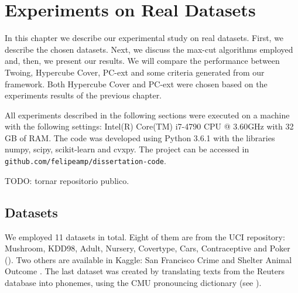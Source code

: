 \newpage

\chapter{Experiments on Real Datasets}
\label{chap:experiments-datasets}


In this chapter we describe our experimental study on real datasets. First, we describe the chosen datasets. Next, we discuss the max-cut algorithms 
employed and, then, we present our results. We will compare the performance between Twoing, Hypercube Cover, PC-ext and some criteria generated from our framework. Both Hypercube Cover and PC-ext were chosen based on the experiments results of the previous chapter.

All  experiments described in the following sections were executed on a machine with the following settings: Intel(R) Core(TM) i7-4790 CPU @ 3.60GHz with 32 GB of RAM. The code was developed using Python 3.6.1 with the libraries numpy, scipy, scikit-learn and cvxpy.
The project can be accessed in {\tt github.com/felipeamp/dissertation-code}.

TODO: tornar repositorio publico.

\section{Datasets}
We employed 11 datasets in total. Eight of them are from the UCI repository:
Mushroom, KDD98, Adult, Nursery, Covertype, Cars, Contraceptive and Poker (\cite{Lichman:2013}).
Two others are available in Kaggle: San Francisco Crime and Shelter Animal Outcome
\cite{SFC,AnimalShelter}. The last dataset was created by translating texts from the Reuters database \cite{Lichman:2013} into phonemes, using the CMU pronouncing dictionary (see \cite{CMU-PD}).

